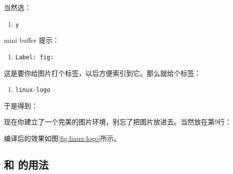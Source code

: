 当然选：

\begin{enumerate}
\item[] \texttt{y}
\end{enumerate}

mini buffer 提示：

\begin{enumerate}
\item[] \texttt{Label: fig:}
\end{enumerate}

这是要你给图片打个标签，以后方便索引到它。那么就给个标签：

\begin{enumerate}
\item[] \texttt{linux-logo}
\end{enumerate}

于是得到：

\begin{codeblock}[.9]
\end{codeblock}

现在你建立了一个完美的图片环境，别忘了把图片放进去。当然放在第9行：

\begin{codeblock}[.9]
\end{codeblock}

编译后的效果如图\ref{fig:linux-logo}所示。

\subsection{和 的用法}
\label{sec:label}

